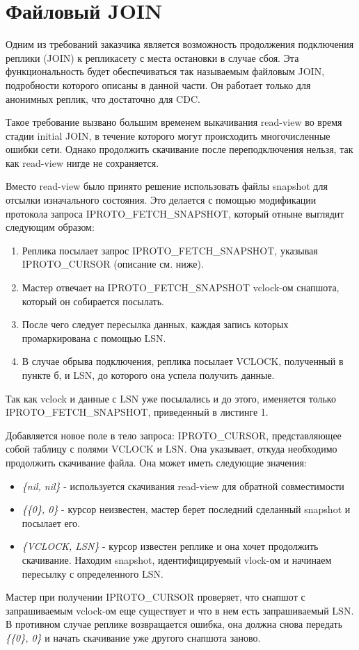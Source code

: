 \section{Файловый JOIN}

Одним из требований заказчика является возможность продолжения подключения реплики (JOIN) к репликасету с места остановки в случае сбоя. Эта функциональность будет обеспечиваться так называемым файловым JOIN, подробности которого описаны в данной части. Он работает только для анонимных реплик, что достаточно для CDC.

Такое требование вызвано большим временем выкачивания read-view во время стадии initial JOIN, в течение которого могут происходить многочисленные ошибки сети. Однако продолжить скачивание после переподключения нельзя, так как read-view нигде не сохраняется.

Вместо read-view было принято решение использовать файлы snapshot для отсылки изначального состояния. Это делается с помощью модификации протокола запроса IPROTO\_FETCH\_SNAPSHOT, который отныне выглядит следующим образом:

\begin{enumerate}
    \item Реплика посылает запрос IPROTO\_FETCH\_SNAPSHOT, указывая IPROTO\_CURSOR (описание см. ниже).
    \item Мастер отвечает на IPROTO\_FETCH\_SNAPSHOT vclock-ом снапшота, который он собирается посылать.
    \item После чего следует пересылка данных, каждая запись которых промаркирована с помощью LSN.
    \item В случае обрыва подключения, реплика посылает VCLOCK, полученный в пункте б, и LSN, до которого она успела получить данные.
\end{enumerate}

Так как vclock и данные с LSN уже посылались и до этого, именяется только IPROTO\_FETCH\_SNAPSHOT, приведенный в листинге 1.


Добавляется новое поле в тело запроса: IPROTO\_CURSOR, представляющее собой таблицу с полями VCLOCK и LSN. Она указывает, откуда необходимо продолжить скачивание файла. Она может иметь следующие значения:

\begin{itemize}
    \item \textit{\{nil, nil\}} - используется скачивания read-view для обратной совместимости
    \item \textit{\{\{0\}, 0\}} - курсор неизвестен, мастер берет последний сделанный snapshot и посылает его.
    \item \textit{\{VCLOCK, LSN\}} - курсор известен реплике и она хочет продолжить скачивание. Находим snapshot, идентифицируемый vlock-ом и начинаем пересылку с определенного LSN.
\end{itemize}

Мастер при получении IPROTO\_CURSOR проверяет, что снапшот с запрашиваемым vclock-ом еще существует и что в нем есть запрашиваемый LSN. В противном случае реплике возвращается ошибка, она должна снова передать \textit{\{\{0\}, 0\}} и начать скачивание уже другого снапшота заново.
